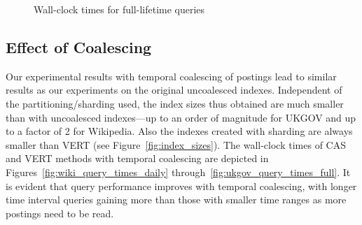 \begin{figure}[tb]
  	\centering
   	\caption{Wall-clock times for full-lifetime queries}
\label{fig:sharding_qp_cas_vert_full}
\end{figure}

\subsection{Effect of Coalescing}
\label{expt:coa}

Our experimental results with temporal coalescing of postings
lead to similar results as our experiments on the original
uncoalesced indexes. Independent of the partitioning/sharding used,
the index sizes thus obtained are much smaller than with uncoalesced indexes---up to an
order of magnitude for UKGOV and up to a factor of 2 for
Wikipedia. Also the indexes created with sharding are always smaller than
VERT (see Figure~\ref{fig:index_sizes}). The wall-clock times of CAS and VERT methods with temporal coalescing are depicted in
Figures~\ref{fig:wiki_query_times_daily} through~\ref{fig:ukgov_query_times_full}. It is evident that query
performance improves with temporal coalescing, with longer time interval
queries gaining more than those with smaller time ranges as more
postings need to be read. 

